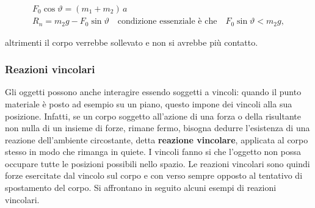 \begin{figure}[htpb]
\end{figure}

\begin{gather*}
	F_0\cos\vartheta=(m_1+m_2)\,a \\
	R_n=m_2 g-F_0\sin\vartheta \quad \text{condizione essenziale è che} \quad F_0\sin\vartheta<m_2 g,
\end{gather*}

altrimenti il corpo verrebbe sollevato e non si avrebbe più contatto.

\subsubsection{Reazioni vincolari}

Gli oggetti possono anche interagire essendo soggetti a vincoli: quando il punto materiale è posto ad esempio su un piano, questo impone dei vincoli alla sua posizione. Infatti, se un corpo soggetto all'azione di una forza o della risultante non nulla di un insieme di forze, rimane fermo, bisogna dedurre l'esistenza di una reazione dell'ambiente circostante, detta \textbf{reazione vincolare}, applicata al corpo stesso in modo che rimanga in quiete. I vincoli fanno si che l'oggetto non possa occupare tutte le posizioni possibili nello spazio. Le reazioni vincolari sono quindi forze esercitate dal vincolo sul corpo e con verso sempre opposto al tentativo di spostamento del corpo. Si affrontano in seguito alcuni esempi di reazioni vincolari.


